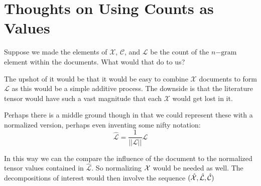 \documentclass{article}
\begin{document}
\section{Thoughts on Using Counts as Values}
Suppose we made the elements of $\mathcal{X}$, $\mathcal{C}$, and $\mathcal{L}$ be the
count of the $n\mathrm{-gram}$ element within the documents.  What would that do to us?

The upshot of it would be that it would be easy to combine $\mathcal{X}$ documents to 
form $\mathcal{L}$ as this would be a simple additive process. The downside is that the
literature tensor would have such a vast magnitude that each $\mathcal{X}$ would get 
lost in it.

Perhaps there is a middle ground though in that we could represent these with a normalized
version, perhaps even inventing some nifty notation:
\[
\hat{\mathcal{L}} = \displaystyle\frac{1}{||\mathcal{L}||} \mathcal{L}
\]

In this way we can the compare the influence of the document to the normalized tensor
values contained in $\hat{\mathcal{L}}$.  So normalizing $\mathcal{X}$ would be needed as well.
The decompositions of interest would then involve the sequence $(\hat{\mathcal{X}}, \hat{\mathcal{L}}, \hat{\mathcal{C}})$
\end{document}
